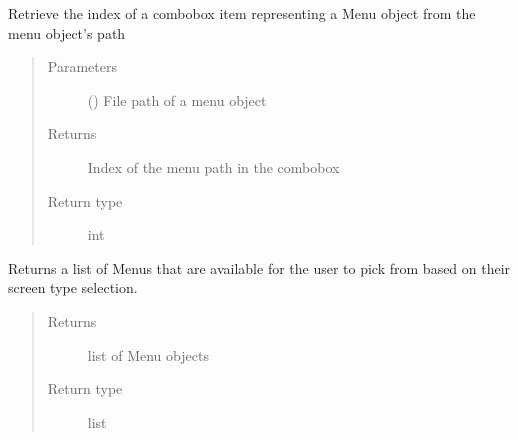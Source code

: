 \documentclass[letterpaper,10pt,english]{sphinxmanual}
\begin{document}
\begin{fulllineitems}
\begin{fulllineitems}
\label{\detokenize{polo.windows:polo.windows.run_importer_dialog.RunImporterDialog.get_menu_index_by_path}}
Retrieve the index of a combobox item representing a Menu object
from the menu object’s path
\begin{quote}\begin{description}
\item[{Parameters}] \leavevmode
{} () \textendash{} File path of a menu object

\item[{Returns}] \leavevmode
Index of the menu path in the combobox

\item[{Return type}] \leavevmode
int

\end{description}\end{quote}

\end{fulllineitems}


\begin{fulllineitems}
\label{\detokenize{polo.windows:polo.windows.run_importer_dialog.RunImporterDialog.get_menu_options}}
Returns a list of Menus that are available for the user to pick from
based on their screen type selection.
\begin{quote}\begin{description}
\item[{Returns}] \leavevmode
list of Menu objects

\item[{Return type}] \leavevmode
list

\end{description}\end{quote}

\end{fulllineitems}



\end{fulllineitems}
\end{document}
